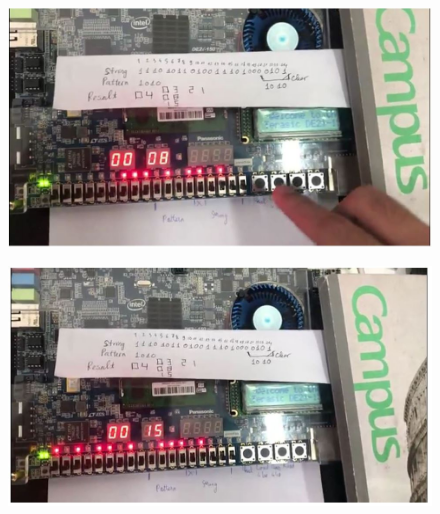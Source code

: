\documentclass[a4paper]{article}
\begin{document}
	\begin{center}
	\begin{figure}[H]
		\begin{center}
			\includegraphics[scale=.5] {k5.jpg}
		\end{center}
	\end{figure}
	\end{center}  
	
	\begin{center}
	\begin{figure}[H]
		\begin{center}
			\includegraphics[scale=.5] {k6.jpg}
		\end{center}
	\end{figure}
	\end{center}  
	
\end{document}
